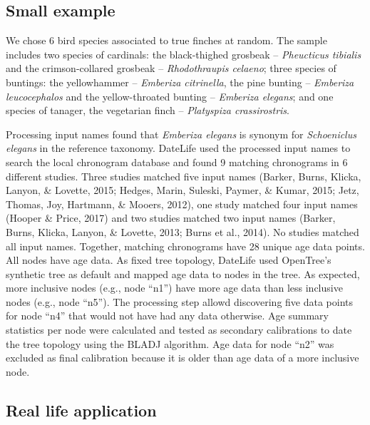 \documentclass[
  english,
  man]{apa6}
\begin{document}
\hypertarget{small-example}{%
\subsection{Small example}\label{small-example}}

We chose 6 bird species associated to true finches at random. The sample includes
two species of cardinals:
the black-thighed grosbeak -- \emph{Pheucticus tibialis} and
the crimson-collared grosbeak -- \emph{Rhodothraupis celaeno};
three species of buntings:
the yellowhammer -- \emph{Emberiza citrinella},
the pine bunting -- \emph{Emberiza leucocephalos} and
the yellow-throated bunting -- \emph{Emberiza elegans};
and one species of tanager, the vegetarian finch -- \emph{Platyspiza crassirostris}.

Processing input names found that \emph{Emberiza elegans} is synonym for \emph{Schoeniclus elegans} in the reference taxonomy.
DateLife used the processed input names to search the local chronogram database and found 9 matching chronograms in 6 different studies. Three studies matched five input names (Barker, Burns, Klicka, Lanyon, \& Lovette, 2015; Hedges, Marin, Suleski, Paymer, \& Kumar, 2015; Jetz, Thomas, Joy, Hartmann, \& Mooers, 2012), one study matched four input names (Hooper \& Price, 2017) and two studies matched two input names (Barker, Burns, Klicka, Lanyon, \& Lovette, 2013; Burns et al., 2014). No studies matched all input names. Together, matching chronograms have 28 unique age data points. All nodes have age data.
As fixed tree topology, DateLife used OpenTree's synthetic tree as default and mapped age data to nodes in the tree.
As expected, more inclusive nodes (e.g., node ``n1'') have more age data than less inclusive nodes (e.g., node ``n5'').
The processing step allowd discovering five data points for node ``n4'' that would not have had any data otherwise.
Age summary statistics per node were calculated and tested as secondary calibrations to date the tree topology using the BLADJ algorithm.
Age data for node ``n2'' was excluded as final calibration because it is older than age data of a more inclusive node.

\hypertarget{real-life-application}{%
\subsection{Real life application}\label{real-life-application}}
\end{document}
